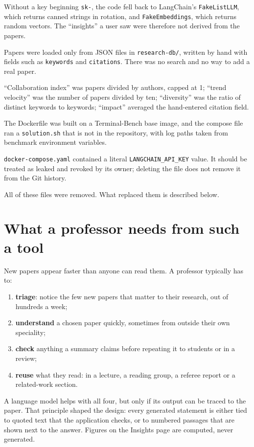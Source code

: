 \documentclass[11pt,a4paper]{article}
\newcommand{\code}[1]{\texttt{#1}}
\begin{document}
\begin{description}[leftmargin=0pt]
\item[The AI was a placeholder.] Without a key beginning \code{sk-}, the code fell back to LangChain's
  \code{FakeListLLM}, which returns canned strings in rotation, and \code{FakeEmbeddings}, which returns
  random vectors. The ``insights'' a user saw were therefore not derived from the papers.
\item[The papers were not real.] Papers were loaded only from JSON files in \code{research-db/}, written by
  hand with fields such as \code{keywords} and \code{citations}. There was no search and no way to add a
  real paper.
\item[The metrics did not measure their names.] ``Collaboration index'' was papers divided by authors,
  capped at 1; ``trend velocity'' was the number of papers divided by ten; ``diversity'' was the ratio of
  distinct keywords to keywords; ``impact'' averaged the hand-entered citation field.
\item[Docker could not run.] The Dockerfile was built on a Terminal-Bench base image, and the compose file
  ran a \code{solution.sh} that is not in the repository, with log paths taken from benchmark environment
  variables.
\item[A credential was committed.] \code{docker-compose.yaml} contained a literal \code{LANGCHAIN\_API\_KEY}
  value. It should be treated as leaked and revoked by its owner; deleting the file does not remove it from
  the Git history.
\end{description}

All of these files were removed. What replaced them is described below.

\section{What a professor needs from such a tool}

New papers appear faster than anyone can read them. A professor typically has to:
\begin{enumerate}
\item \textbf{triage}: notice the few new papers that matter to their research, out of hundreds a week;
\item \textbf{understand} a chosen paper quickly, sometimes from outside their own speciality;
\item \textbf{check} anything a summary claims before repeating it to students or in a review;
\item \textbf{reuse} what they read: in a lecture, a reading group, a referee report or a related-work section.
\end{enumerate}
A language model helps with all four, but only if its output can be traced to the paper. That principle
shaped the design: every generated statement is either tied to quoted text that the application checks, or
to numbered passages that are shown next to the answer. Figures on the Insights page are computed, never
generated.
\end{document}
